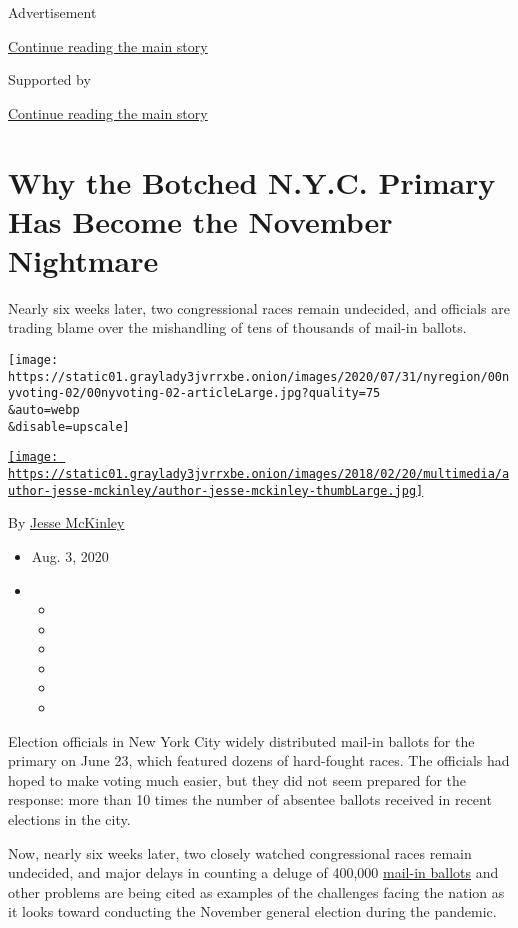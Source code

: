 Advertisement

\protect\hyperlink{after-top}{Continue reading the main story}

Supported by

\protect\hyperlink{after-sponsor}{Continue reading the main story}

\hypertarget{why-the-botched-nyc-primary-has-become-the-november-nightmare}{%
\section{Why the Botched N.Y.C. Primary Has Become the November
Nightmare}\label{why-the-botched-nyc-primary-has-become-the-november-nightmare}}

Nearly six weeks later, two congressional races remain undecided, and
officials are trading blame over the mishandling of tens of thousands of
mail-in ballots.

\texttt{[image: https://static01.graylady3jvrrxbe.onion/images/2020/07/31/nyregion/00nyvoting-02/00nyvoting-02-articleLarge.jpg?quality=75\\\&auto=webp\\\&disable=upscale]}

\href{https://www.nytimes3xbfgragh.onion/by/jesse-mckinley}{\texttt{[image: https://static01.graylady3jvrrxbe.onion/images/2018/02/20/multimedia/author-jesse-mckinley/author-jesse-mckinley-thumbLarge.jpg]}}

By \href{https://www.nytimes3xbfgragh.onion/by/jesse-mckinley}{Jesse
McKinley}

\begin{itemize}
\item
  Aug. 3, 2020
\item
  \begin{itemize}
  \item
  \item
  \item
  \item
  \item
  \item
  \end{itemize}
\end{itemize}

Election officials in New York City widely distributed mail-in ballots
for the primary on June 23, which featured dozens of hard-fought races.
The officials had hoped to make voting much easier, but they did not
seem prepared for the response: more than 10 times the number of
absentee ballots received in recent elections in the city.

Now, nearly six weeks later, two closely watched congressional races
remain undecided, and major delays in counting a deluge of 400,000
\href{https://www.nytimes3xbfgragh.onion/2020/08/03/us/politics/trump-mail-in-voting.html}{mail-in
ballots} and other problems are being cited as examples of the
challenges facing the nation as it looks toward conducting the November
general election during the pandemic.

